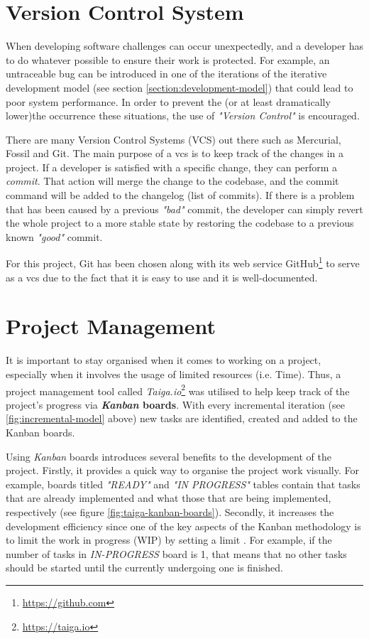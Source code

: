 \section{Version Control System}
When developing software challenges can occur unexpectedly, and a developer has to do whatever possible to ensure their work is protected. For example, an untraceable bug can be introduced in one of the iterations of the iterative development model (see section \ref{section:development-model}) that could lead to poor system performance. In order to prevent the (or at least dramatically lower)the occurrence these situations, the use of \textit{"Version Control"} is encouraged.

There are many Version Control Systems (VCS) out there such as Mercurial, Fossil and Git. The main purpose of a \gls{vcs} is to keep track of the changes in a project. If a developer is satisfied with a specific change, they can perform a \textit{commit}. That action will merge the change to the codebase, and the commit command will be added to the changelog (list of commits). If there is a problem that has been caused by a previous \textit{"bad"} commit, the developer can simply revert the whole project to a more stable state by restoring the codebase to a previous known \textit{"good"} commit.

For this project, Git has been chosen along with its web service GitHub\footnote{\url{https://github.com}} to serve as a \gls{vcs} due to the fact that it is easy to use and it is well-documented.


\section{Project Management}
It is important to stay organised when it comes to working on a project, especially when it involves the usage of limited resources (i.e. Time). Thus, a project management tool called \textit{Taiga.io}\footnote{\url{https://taiga.io}} was utilised to help keep track of the project's progress via \textbf{\textit{Kanban} boards}. With every incremental iteration (see \ref{fig:incremental-model} above) new tasks are identified, created and added to the Kanban boards.

Using \textit{Kanban} boards introduces several benefits to the development of the project. Firstly, it provides a quick way to organise the project work visually. For example, boards titled \textit{"READY"} and \textit{"IN PROGRESS"} tables contain that tasks that are already implemented and what those that are being implemented, respectively (see figure \ref{fig:taiga-kanban-boards}). Secondly, it increases the development efficiency since one of the key aspects of the Kanban methodology is to limit the work in progress (WIP) by setting a limit \citep[]{atlassian2017}. For example, if the number of tasks in \textit{IN-PROGRESS} board is 1, that means that no other tasks should be started until the currently undergoing one is finished.

